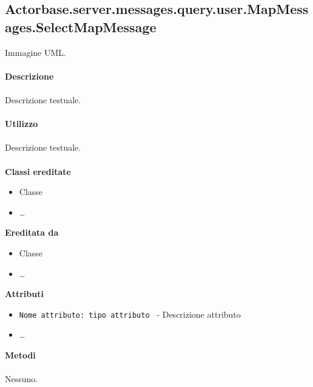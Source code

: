 \documentclass[a4paper]{article}
\begin{document}
	\subsection{Actorbase.server.messages.query.user.MapMessages.SelectMapMessage}
		Immagine UML.
		\\ \\
		\textbf{Descrizione}
			\\ \\
			Descrizione testuale.
			\\ \\
		\textbf{Utilizzo}
			\\ \\
			Descrizione testuale.
			\\ \\
		\textbf{Classi ereditate}
			\begin{itemize}
				\item Classe
				\item \dots
			\end{itemize}
		\textbf{Ereditata da}
			\begin{itemize}
				\item Classe
				\item \dots
			\end{itemize}
		\textbf{Attributi}
			\begin{itemize}
				\item \texttt{Nome attributo: tipo attributo } - Descrizione attributo
				\item \dots
			\end{itemize}
		\textbf{Metodi}
			\\ \\
			Nessuno.
			
\end{document}
